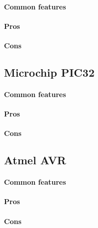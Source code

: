 \documentclass[a4paper,10pt]{article}
\begin{document}
\begin{multicols}{2}
\TODO


\paragraph{Common features}
\TODO


\paragraph{Pros}
\TODO


\paragraph{Cons}
\TODO


\subsection{Microchip PIC32}

\TODO


\paragraph{Common features}
\TODO


\paragraph{Pros}
\TODO


\paragraph{Cons}
\TODO


\subsection{Atmel AVR}

\TODO


\paragraph{Common features}
\TODO


\paragraph{Pros}
\TODO


\paragraph{Cons}
\TODO



\end{multicols}
\end{document}
